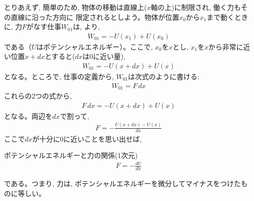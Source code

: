 とりあえず, 簡単のため, 物体の移動は直線上($x軸$の上)に制限され, 働く力もその直線に沿った方向に
限定されるとしよう。物体が位置$x_0$から$x_1$まで動くときに, 力$F$がなす仕事$W_{01}$は, 
より, 
\begin{eqnarray}
W_{01}=-U(x_1)+U(x_0)
\end{eqnarray}
である（$U$はポテンシャルエネルギー）。ここで, $x_0$を$x$とし, $x_1$を$x$から非常に近い位置$x+dx$とすると($dx$は0に近い量), 
\begin{eqnarray}
W_{01}=-U(x+dx)+U(x)\label{eq:W01UxdxUx}
\end{eqnarray}
となる。ところで, 仕事の定義から, $W_{01}$は次式のように書ける:
\begin{eqnarray} 
W_{01}=F\,dx
\end{eqnarray} 
これらの2つの式から, 
\begin{eqnarray}
F\,dx=-U(x+dx)+U(x)
\end{eqnarray}
となる。両辺を$dx$で割って, 
\begin{eqnarray}
F=-\frac{U(x+dx)-U(x)}{dx}
\end{eqnarray}
ここで$dx$が十分に0に近いことを思い出せば, 
\begin{itembox}{ポテンシャルエネルギーと力の関係(1次元)}
\begin{eqnarray}
F=-\frac{dU}{dx}
\end{eqnarray}
\end{itembox}
である。つまり, 力は, ポテンシャルエネルギーを微分してマイナスをつけたものに等しい。\mv

